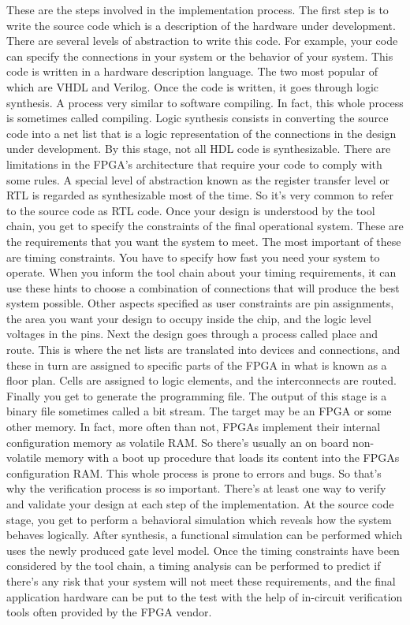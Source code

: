 These are the steps involved in the implementation process. The first step is to write the source code which is a description of the hardware under development. There are several levels of abstraction to write this code. For example, your code can specify the connections in your system or the behavior of your system. This code is written in a hardware description language. The two most popular of which are VHDL and Verilog. Once the code is written, it goes through logic synthesis. A process very similar to software compiling. In fact, this whole process is sometimes called compiling. Logic synthesis consists in converting the source code into a net list that is a logic representation of the connections in the design under development. By this stage, not all HDL code is synthesizable. There are limitations in the FPGA's architecture that require your code to comply with some rules. A special level of abstraction known as the register transfer level or RTL is regarded as synthesizable most of the time. So it's very common to refer to the source code as RTL code. Once your design is understood by the tool chain, you get to specify the constraints of the final operational system. These are the requirements that you want the system to meet. The most important of these are timing constraints. You have to specify how fast you need your system to operate. When you inform the tool chain about your timing requirements, it can use these hints to choose a combination of connections that will produce the best system possible. Other aspects specified as user constraints are pin assignments, the area you want your design to occupy inside the chip, and the logic level voltages in the pins. Next the design goes through a process called place and route. This is where the net lists are translated into devices and connections, and these in turn are assigned to specific parts of the FPGA in what is known as a floor plan. Cells are assigned to logic elements, and the interconnects are routed. Finally you get to generate the programming file. The output of this stage is a binary file sometimes called a bit stream. The target may be an FPGA or some other memory. In fact, more often than not, FPGAs implement their internal configuration memory as volatile RAM. So there's usually an on board non-volatile memory with a boot up procedure that loads its content into the FPGAs configuration RAM. This whole process is prone to errors and bugs. So that's why the verification process is so important. There's at least one way to verify and validate your design at each step of the implementation. At the source code stage, you get to perform a behavioral simulation which reveals how the system behaves logically. After synthesis, a functional simulation can be performed which uses the newly produced gate level model. Once the timing constraints have been considered by the tool chain, a timing analysis can be performed to predict if there's any risk that your system will not meet these requirements, and the final application hardware can be put to the test with the help of in-circuit verification tools often provided by the FPGA vendor.

